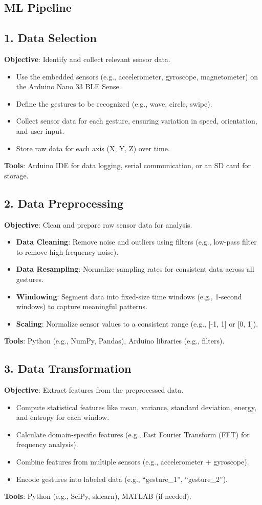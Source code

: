 \subsection{ML Pipeline}

\subsection{1. Data Selection}
\textbf{Objective}: Identify and collect relevant sensor data.  
\begin{itemize}
    \item Use the embedded sensors (e.g., accelerometer, gyroscope, magnetometer) on the Arduino Nano 33 BLE Sense.
    \item Define the gestures to be recognized (e.g., wave, circle, swipe).
    \item Collect sensor data for each gesture, ensuring variation in speed, orientation, and user input.
    \item Store raw data for each axis (X, Y, Z) over time.
\end{itemize}
\textbf{Tools}: Arduino IDE for data logging, serial communication, or an SD card for storage.

\subsection{2. Data Preprocessing}
\textbf{Objective}: Clean and prepare raw sensor data for analysis.  
\begin{itemize}
    \item \textbf{Data Cleaning}: Remove noise and outliers using filters (e.g., low-pass filter to remove high-frequency noise).
    \item \textbf{Data Resampling}: Normalize sampling rates for consistent data across all gestures.
    \item \textbf{Windowing}: Segment data into fixed-size time windows (e.g., 1-second windows) to capture meaningful patterns.
    \item \textbf{Scaling}: Normalize sensor values to a consistent range (e.g., [-1, 1] or [0, 1]).
\end{itemize}
\textbf{Tools}: Python (e.g., NumPy, Pandas), Arduino libraries (e.g., filters).

\subsection{3. Data Transformation}
\textbf{Objective}: Extract features from the preprocessed data.  
\begin{itemize}
    \item Compute statistical features like mean, variance, standard deviation, energy, and entropy for each window.
    \item Calculate domain-specific features (e.g., Fast Fourier Transform (FFT) for frequency analysis).
    \item Combine features from multiple sensors (e.g., accelerometer + gyroscope).
    \item Encode gestures into labeled data (e.g., ``gesture\_1'', ``gesture\_2'').
\end{itemize}
\textbf{Tools}: Python (e.g., SciPy, sklearn), MATLAB (if needed).

